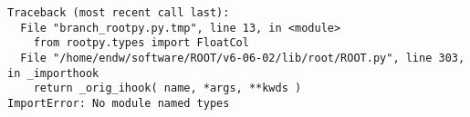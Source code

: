 \begin{footnotesize}
\begin{verbatim}
Traceback (most recent call last):
  File "branch_rootpy.py.tmp", line 13, in <module>
    from rootpy.types import FloatCol
  File "/home/endw/software/ROOT/v6-06-02/lib/root/ROOT.py", line 303, in _importhook
    return _orig_ihook( name, *args, **kwds )
ImportError: No module named types
\end{verbatim}
\end{footnotesize}
